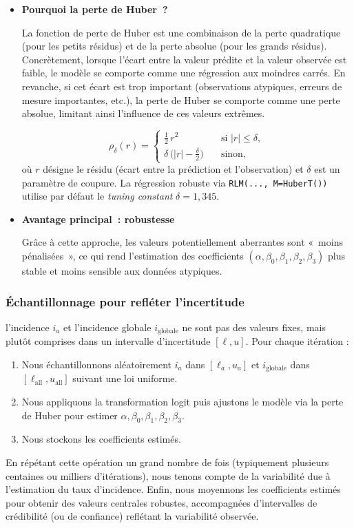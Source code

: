 \begin{itemize}
	\item \textbf{Pourquoi la perte de Huber~?} 
	
	La fonction de perte de Huber est une combinaison de la perte quadratique (pour les petits résidus) et de la perte absolue (pour les grands résidus). Concrètement, lorsque l'écart entre la valeur prédite et la valeur observée est faible, le modèle se comporte comme une régression aux moindres carrés. En revanche, si cet écart est trop important (observations atypiques, erreurs de mesure importantes, etc.), la perte de Huber se comporte comme une perte absolue, limitant ainsi l'influence de ces valeurs extrêmes. 
	
	\[
	\rho_{\delta}(r) = 
	\begin{cases}
		\frac{1}{2} \, r^2 \quad &\text{si } |r| \leq \delta, \\
		\delta\,\bigl(|r| - \frac{\delta}{2}\bigr) \quad &\text{sinon,}
	\end{cases}
	\]
	où \(r\) désigne le résidu (écart entre la prédiction et l'observation) et \(\delta\) est un paramètre de coupure. La régression robuste via \texttt{RLM(..., M=HuberT())} utilise par défaut le \emph{tuning constant} $\delta = 1,345$.
	
	\item \textbf{Avantage principal~: robustesse} 
	
	Grâce à cette approche, les valeurs potentiellement aberrantes sont «~moins pénalisées~», ce qui rend l'estimation des coefficients \((\alpha, \beta_0, \beta_1, \beta_2, \beta_3)\) plus stable et moins sensible aux données atypiques.
\end{itemize}

\subsubsection*{Échantillonnage pour refléter l'incertitude}
l'incidence $i_a$ et l'incidence globale $i_{\mathrm{globale}}$ ne sont pas des valeurs fixes, mais plutôt comprises dans un intervalle d'incertitude \([\ell, u]\). Pour chaque itération :
\begin{enumerate}
	\item Nous échantillonnons aléatoirement $i_a$ dans \([\ell_a, u_a]\) et $i_{\mathrm{globale}}$ dans \([\ell_{\mathrm{all}}, u_{\mathrm{all}}]\) suivant une loi uniforme. 
	\item Nous appliquons la transformation logit puis ajustons le modèle via la perte de Huber pour estimer \(\alpha, \beta_0, \beta_1, \beta_2, \beta_3\).
	\item Nous stockons les coefficients estimés.
\end{enumerate}
En répétant cette opération un grand nombre de fois (typiquement plusieurs centaines ou milliers d'itérations), nous tenons compte de la variabilité due à l'estimation du taux d'incidence. Enfin, nous moyennons les coefficients estimés pour obtenir des valeurs centrales robustes, accompagnées d'intervalles de crédibilité (ou de confiance) reflétant la variabilité observée.

